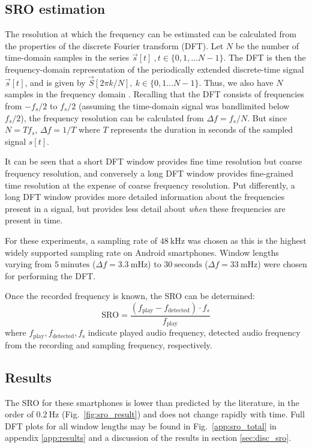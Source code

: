 \documentclass[a4paper, notitlepage]{report}
\begin{document}
\subsection{SRO estimation}
The resolution at which the frequency can be estimated can be calculated from the properties of the discrete Fourier transform (DFT). Let $N$ be the number of time-domain samples in the series $\vec{s}[t]~,t\in\{0,1,\dots N-1\}$. The DFT is then the frequency-domain representation of the periodically extended discrete-time signal $\vec{s}[t]$, and is given by $\vec{S}[2\pi k/N],~k\in\{0, 1\dots N-1\}$. Thus, we also have $N$ samples in the frequency domain \cite[p.~421-422]{Proakis2007}.
Recalling that the DFT consists of frequencies from $-f_s/2$ to $f_s/2$ (assuming the time-domain signal was bandlimited below $f_s/2$), the frequency resolution can be calculated from $\Delta f=f_s/N$. But since $N=Tf_s$, $\Delta f = 1/T$ where $T$ represents the duration in seconds of the sampled signal $s[t]$.

It can be seen that a short DFT window provides fine time resolution but coarse frequency resolution, and conversely a long DFT window provides fine-grained time resolution at the expense of coarse frequency resolution. Put differently, a long DFT window provides more detailed information about the frequencies present in a signal, but provides less detail about \emph{when} these frequencies are present in time.

For these experiments, a sampling rate of $48~\mathrm{kHz}$ was chosen as this is the highest widely supported sampling rate on Android smartphones. Window lengths varying from $5~\mathrm{minutes}$ ($\Delta f = 3.3~\mathrm{mHz}$) to $30~\mathrm{seconds}$ ($\Delta f = 33~\mathrm{mHz}$) were chosen for performing the DFT.


Once the recorded frequency is known, the SRO can be determined:
$$\text{SRO} = \frac{\left(f_{\text{play}}-f_{\text{detected}}\right)\cdot f_s}{f_\text{play}}$$
where $f_{\text{play}}, f_{\text{detected}}, f_{\text{s}}$ indicate played audio frequency, detected audio frequency from the recording and sampling frequency, respectively.

\subsection{Results}
The SRO for these smartphones is lower than predicted by the literature, in the order of $0.2~\mathrm{Hz}$ (Fig.~\ref{fig:sro_result}) and does not change rapidly with time. Full DFT plots for all window lengths may be found in Fig.~\ref{app:sro_total} in appendix \ref{app:results} and a discussion of the results in section \ref{sec:disc_sro}.
\end{document}

